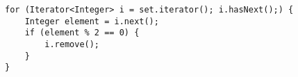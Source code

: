 \begin{verbatim}
for (Iterator<Integer> i = set.iterator(); i.hasNext();) {
    Integer element = i.next();
    if (element % 2 == 0) {
        i.remove();
    }
}
\end{verbatim}
